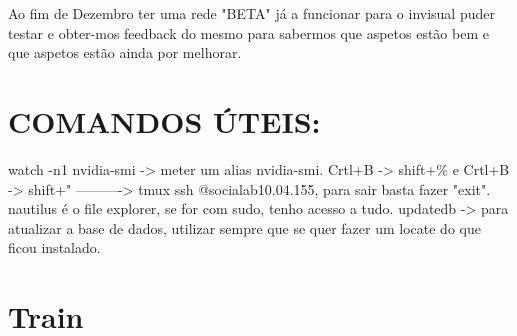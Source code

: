     Ao fim de Dezembro ter uma rede "BETA" já a funcionar para o invisual puder testar e obter-mos feedback do mesmo para sabermos que aspetos estão bem e que aspetos estão ainda por melhorar.
        
        
    \section{COMANDOS ÚTEIS:}
    
    watch -n1 nvidia-smi  -> meter um alias nvidia-smi.
    Crtl+B -> shift+\% e Crtl+B -> shift+" ----------> tmux
    ssh @socialab10.04.155, para sair basta fazer "exit".
    nautilus é o file explorer, se for com sudo, tenho acesso a tudo.
    updatedb -> para atualizar a base de dados, utilizar sempre que se quer fazer um locate do que ficou instalado.
    
    
    
    \section{Train}
    
